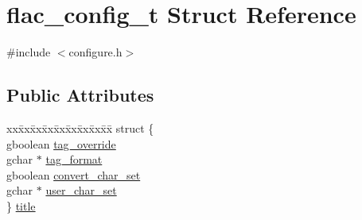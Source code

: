 \hypertarget{structflac__config__t}{}\section{flac\+\_\+config\+\_\+t Struct Reference}
\label{structflac__config__t}


{\ttfamily \#include $<$configure.\+h$>$}

\subsection*{Public Attributes}
\begin{DoxyCompactItemize}
\item 
\begin{tabbing}
xx\=xx\=xx\=xx\=xx\=xx\=xx\=xx\=xx\=\kill
struct \{\\
\>gboolean \hyperlink{structflac__config__t_a1108c9746f8d452fc951b10dcdfb84d0}{tag\_override}\\
\>gchar $\ast$ \hyperlink{structflac__config__t_a313d9a19fc781cd361f06b755d6766ee}{tag\_format}\\
\>gboolean \hyperlink{structflac__config__t_a19c730b12fadee5a94f8b6d7b994b764}{convert\_char\_set}\\
\>gchar $\ast$ \hyperlink{structflac__config__t_a86a1b0fecc95d250a041ab9e8b083342}{user\_char\_set}\\
\} \hyperlink{structflac__config__t_a606d92e0f1f5a674fbffc6045fa4518a}{title}\\


\end{tabbing}
\end{DoxyCompactItemize}
